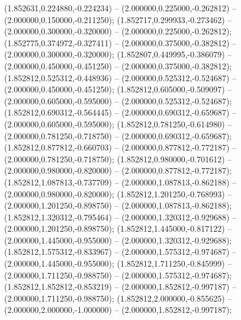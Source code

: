  (1.852631,0.224880,-0.224234) -- (2.000000,0.225000,-0.262812) -- (2.000000,0.150000,-0.211250);
 (1.852717,0.299933,-0.273462) -- (2.000000,0.300000,-0.320000) -- (2.000000,0.225000,-0.262812);
 (1.852775,0.374972,-0.327411) -- (2.000000,0.375000,-0.382812) -- (2.000000,0.300000,-0.320000);
 (1.852807,0.449995,-0.386079) -- (2.000000,0.450000,-0.451250) -- (2.000000,0.375000,-0.382812);
 (1.852812,0.525312,-0.448936) -- (2.000000,0.525312,-0.524687) -- (2.000000,0.450000,-0.451250);
 (1.852812,0.605000,-0.509097) -- (2.000000,0.605000,-0.595000) -- (2.000000,0.525312,-0.524687);
 (1.852812,0.690312,-0.564445) -- (2.000000,0.690312,-0.659687) -- (2.000000,0.605000,-0.595000);
 (1.852812,0.781250,-0.614980) -- (2.000000,0.781250,-0.718750) -- (2.000000,0.690312,-0.659687);
 (1.852812,0.877812,-0.660703) -- (2.000000,0.877812,-0.772187) -- (2.000000,0.781250,-0.718750);
 (1.852812,0.980000,-0.701612) -- (2.000000,0.980000,-0.820000) -- (2.000000,0.877812,-0.772187);
 (1.852812,1.087813,-0.737709) -- (2.000000,1.087813,-0.862188) -- (2.000000,0.980000,-0.820000);
 (1.852812,1.201250,-0.768993) -- (2.000000,1.201250,-0.898750) -- (2.000000,1.087813,-0.862188);
 (1.852812,1.320312,-0.795464) -- (2.000000,1.320312,-0.929688) -- (2.000000,1.201250,-0.898750);
 (1.852812,1.445000,-0.817122) -- (2.000000,1.445000,-0.955000) -- (2.000000,1.320312,-0.929688);
 (1.852812,1.575312,-0.833967) -- (2.000000,1.575312,-0.974687) -- (2.000000,1.445000,-0.955000);
 (1.852812,1.711250,-0.845999) -- (2.000000,1.711250,-0.988750) -- (2.000000,1.575312,-0.974687);
 (1.852812,1.852812,-0.853219) -- (2.000000,1.852812,-0.997187) -- (2.000000,1.711250,-0.988750);
 (1.852812,2.000000,-0.855625) -- (2.000000,2.000000,-1.000000) -- (2.000000,1.852812,-0.997187);
